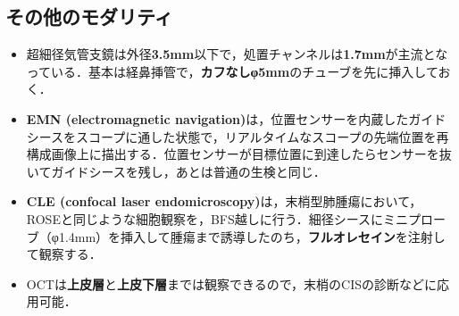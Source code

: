 \subsection{その他のモダリティ}

\begin{itemize}

\item 超細径気管支鏡は外径\textbf{3.5mm}以下で，処置チャンネルは\textbf{1.7mm}が主流となっている．基本は経鼻挿管で，\textbf{カフなしφ5mm}のチューブを先に挿入しておく．

\item \textbf{EMN (electromagnetic navigation)}は，位置センサーを内蔵したガイドシースをスコープに通した状態で，リアルタイムなスコープの先端位置を再構成画像上に描出する．位置センサーが目標位置に到達したらセンサーを抜いてガイドシースを残し，あとは普通の生検と同じ．
\item \textbf{CLE (confocal laser endomicroscopy)}は，末梢型肺腫瘍において，ROSEと同じような細胞観察を，BFS越しに行う．細径シースにミニプローブ（φ1.4mm）を挿入して腫瘍まで誘導したのち，\textbf{フルオレセイン}を注射して観察する．
\item OCTは\textbf{上皮層}と\textbf{上皮下層}までは観察できるので，末梢のCISの診断などに応用可能．
\end{itemize}

